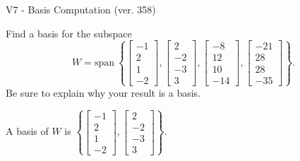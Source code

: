 \begin{exercise}
  \begin{exerciseTitle}V7 - Basis Computation (ver. 358)\end{exerciseTitle}
  \begin{exerciseStatement}
    Find a basis for the subspace 
\[W=\mathrm{span}\ \left\{\left[\begin{array}{r}
-1 \\
2 \\
1 \\
-2
\end{array}\right] , \left[\begin{array}{r}
2 \\
-2 \\
-3 \\
3
\end{array}\right] , \left[\begin{array}{r}
-8 \\
12 \\
10 \\
-14
\end{array}\right] , \left[\begin{array}{r}
-21 \\
28 \\
28 \\
-35
\end{array}\right]\right\}.\]
 Be sure to explain why your result is a basis.


  \end{exerciseStatement}
  \begin{exerciseAnswer}
   A basis of \(W\) is  \(\left\{\left[\begin{array}{r}
-1 \\
2 \\
1 \\
-2
\end{array}\right] , \left[\begin{array}{r}
2 \\
-2 \\
-3 \\
3
\end{array}\right]\right\}\).
  


  \end{exerciseAnswer}
\end{exercise}